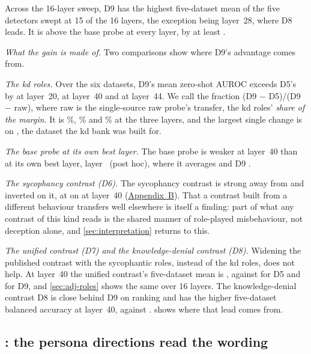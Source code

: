 Across the 16-layer sweep, D9 has the highest five-dataset mean of the five detectors swept at 15 of
the 16 layers, the exception being layer~28, where D8 leads. It is above the base probe at every
layer, by at least .

\emph{What the gain is made of.} Two comparisons show where D9's advantage comes from.

\emph{The kd roles.} Over the six datasets, D9's mean zero-shot AUROC exceeds D5's by
 at layer~20,  at layer~40 and  at layer~44. We
call the fraction (D9 $-$ D5)/(D9 $-$ raw), where raw is the single-source raw probe's transfer, the kd
roles' \emph{share of the margin}. It is \%, \% and
\% at the three layers, and the largest single change is on \hpkr, the dataset the
kd bank was built for.

\emph{The base probe at its own best layer.} The base probe is weaker at layer~40 than at its own
best layer, layer~ (post hoc), where it averages 
and D9 .

\emph{The sycophancy contrast (D6).} The sycophancy contrast is strong away from \hpkr{} and inverted
on it, at  on \hpkr{} at layer~40 (\hyperref[app:supplementary]{Appendix~B}). That a
contrast built from a different behaviour transfers well elsewhere is itself a finding: part of what any
contrast of this kind reads is the shared manner of role-played misbehaviour, not deception alone, and
\cref{sec:interpretation} returns to this.

\emph{The unified contrast (D7) and the knowledge-denial contrast (D8).} Widening the published
contrast with the sycophantic roles, instead of the kd roles, does not help. At layer~40 the unified
contrast's five-dataset mean is , against  for D5 and
 for D9, and \cref{sec:adj-roles} shows the same over 16 layers. The knowledge-denial
contrast D8 is close behind D9 on ranking and has the higher five-dataset balanced accuracy at
layer~40,  against .  shows where that
lead comes from.

\subsection{\hpkr: the persona directions read the wording}
\label{sec:hpkr-tests}

